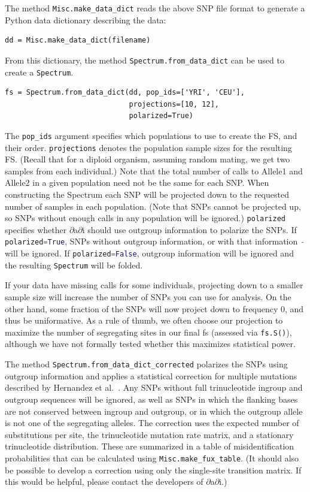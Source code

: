 \documentclass[12pt]{article}
\makeatletter
\newcommand{\dadi}{$\partial$a$\partial$i\xspace}
\newcommand{\py}[1]{\lstinline[language=Python, showstringspaces=False]@#1@}
\makeatother
\begin{document}
The method \py{Misc.make_data_dict} reads the above SNP file format to generate a Python data dictionary describing the data:
\begin{lstlisting}
dd = Misc.make_data_dict(filename)
\end{lstlisting}
From this dictionary, the method \py{Spectrum.from_data_dict} can be used to create a \py{Spectrum}.
\begin{lstlisting}
fs = Spectrum.from_data_dict(dd, pop_ids=['YRI', 'CEU'],
                             projections=[10, 12],
                             polarized=True)
\end{lstlisting}
The \py{pop_ids} argument specifies which populations to use to create the FS, and their order.
\py{projections} denotes the population sample sizes for the resulting FS.
(Recall that for a diploid organism, assuming random mating, we get two samples from each individual.)
Note that the total number of calls to Allele1 and Allele2 in a given population need not be the same for each SNP.
When constructing the Spectrum each SNP will be projected down to the requested number of samples in each population.
(Note that SNPs cannot be projected up, so SNPs without enough calls in any population will be ignored.)
\py{polarized} specifies whether \dadi should use outgroup information to polarize the SNPs.
If \py{polarized=True}, SNPs without outgroup information, or with that information \py{-} will be ignored.
If \py{polarized=False}, outgroup information will be ignored and the resulting \py{Spectrum} will be folded.

If your data have missing calls for some individuals, projecting down to a smaller sample size will increase the number of SNPs you can use for analysis.
On the other hand, some fraction of the SNPs will now project down to frequency 0, and thus be uniformative.
As a rule of thumb, we often choose our projection to maximize the number of segregating sites in our final fs (assessed via \py{fs.S()}), although we have not formally tested whether this maximizes statistical power.

The method \py{Spectrum.from_data_dict_corrected} polarizes the SNPs using outgroup information and applies a statistical correction for multiple mutations described by Hernandez et al.~\cite{bib:Hernandez2007}.
Any SNPs without full trinucleotide ingroup and outgroup sequences will be ignored, as well as SNPs in which the flanking bases are not conserved between ingroup and outgroup, or in which the outgroup allele is not one of the segregating alleles.
The correction uses the expected number of substitutions per site, the trinucleotide mutation rate matrix, and a stationary trinucleotide distribution.
These are summarized in a table of misidentification probabilities that can be calculated using \py{Misc.make_fux_table}.
(It should also be possible to develop a correction using only the single-site transition matrix.
If this would be helpful, please contact the developers of \dadi.)
\end{document}
